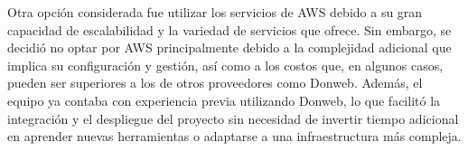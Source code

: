 {%

Otra opción considerada fue utilizar los servicios de AWS \citep{AWSWebsite} debido a su gran capacidad de escalabilidad y la variedad de servicios que ofrece. Sin embargo, se decidió no optar por AWS principalmente debido a la complejidad adicional que implica su configuración y gestión, así como a los costos que, en algunos casos, pueden ser superiores a los de otros proveedores como Donweb. Además, el equipo ya contaba con experiencia previa utilizando Donweb, lo que facilitó la integración y el despliegue del proyecto sin necesidad de invertir tiempo adicional en aprender nuevas herramientas o adaptarse a una infraestructura más compleja.








}
